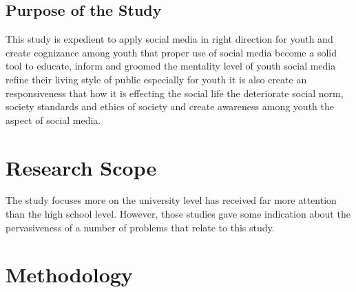 \documentclass[options]{article}
\begin{document}
\subsection{\textbf{Purpose of the Study}}
This study is expedient to apply social media in right direction for youth and create cognizance among youth that proper use of social media become a solid tool to educate, inform and groomed the mentality level of youth social media refine their living style of public especially for youth it is also create an responsiveness that how it is effecting the social life the deteriorate social norm, society standards and ethics of society and create awareness among youth the aspect of social media.

\section{\textbf{Research Scope}}
The study focuses more on the university level has received far more attention than the high school level. However, those studies gave some indication about the pervasiveness of a number of problems that relate to this study.

\section{\textbf{Methodology}}
\end{document}
